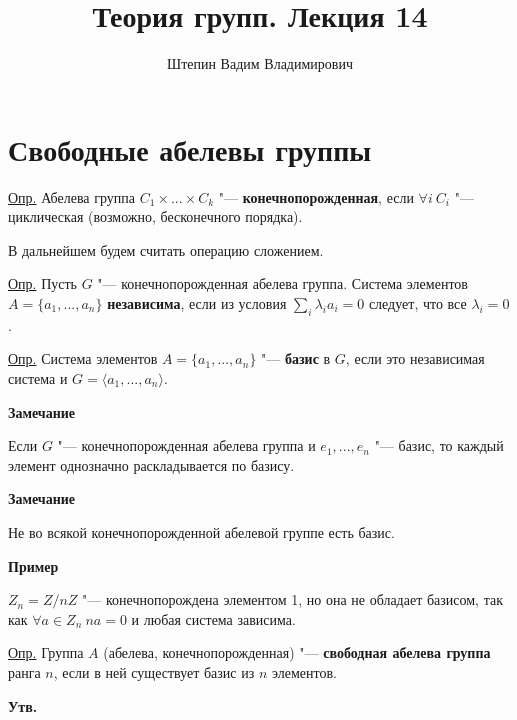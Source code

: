 \documentclass{article}
\title{Теория групп. Лекция 14}
\author{Штепин Вадим Владимирович}
\date{\DTMdate{2019-12-05}}
\begin{document}
\maketitle

\section{Свободные абелевы группы}

\underline{Опр.} Абелева группа $C_1 \times ... \times C_k$ "--- \textbf{конечнопорожденная}, если $\forall i \  C_i$ "--- циклическая (возможно, бесконечного порядка). 

В дальнейшем будем считать операцию сложением.

\vspace{5pt}

\underline{Опр.} Пусть $G$ "--- конечнопорожденная абелева группа. Система элементов $A = \{a_1, ..., a_n\}$ \textbf{независима}, если из условия $\sum \limits_i \lambda_ia_i = 0$ следует, что все $\lambda_i = 0$.

\vspace{5pt}

\underline{Опр.} Система элементов $A = \{a_1, ..., a_n\}$ "--- \textbf{базис} в $G$, если это независимая система и $G = \langle a_1, ..., a_n \rangle$.

\vspace{10pt}

\textbf{Замечание}

Если $G$ "--- конечнопорожденная абелева группа и $e_1, ..., e_n$ "--- базис, то каждый элемент однозначно раскладывается по базису.

\vspace{10pt}

\textbf{Замечание}

Не во всякой конечнопорожденной абелевой группе есть базис.

\textbf{Пример}

$Z_n = Z / nZ$ "--- конечнопорождена элементом 1, но она не обладает базисом, так как $\forall a \in Z_n \ na = 0$ и любая система зависима.

\vspace{5pt}

\underline{Опр.} Группа $A$ (абелева, конечнопорожденная) "--- \textbf{свободная абелева группа} ранга $n$, если в ней существует базис из $n$ элементов.

\vspace{10pt}

\textbf{Утв.}
\end{document}
